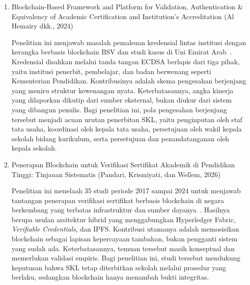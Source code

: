 \begin{enumerate}
    \item {Blockchain-Based Framework and Platform for Validation, Authentication \& Equivalency of Academic Certification and Institution's Accreditation (Al Hemairy dkk., 2024)}\par
    Penelitian ini menjawab masalah pemalsuan kredensial lintas institusi dengan kerangka berbasis blockchain BSV dan studi kasus di Uni Emirat Arab~\cite{AlHemairy2024UAE}. Kredensial disahkan melalui tanda tangan ECDSA berlapis dari tiga pihak, yaitu institusi penerbit, pembelajar, dan badan berwenang seperti Kementerian Pendidikan. Kontribusinya adalah skema pengesahan berjenjang yang meniru struktur kewenangan nyata. Keterbatasannya, angka kinerja yang dilaporkan dikutip dari sumber eksternal, bukan diukur dari sistem yang dibangun penulis. Bagi penelitian ini, pola pengesahan berjenjang tersebut menjadi acuan urutan penerbitan SKL, yaitu penginputan oleh staf tata usaha, koordinasi oleh kepala tata usaha, persetujuan oleh wakil kepala sekolah bidang kurikulum, serta persetujuan dan penandatanganan oleh kepala sekolah.

    \item {Penerapan Blockchain untuk Verifikasi Sertifikat Akademik di Pendidikan Tinggi: Tinjauan Sistematis (Pandari, Krismiyati, dan Wellem, 2026)}\par
    Penelitian ini menelaah 35 studi periode 2017 sampai 2024 untuk menjawab tantangan penerapan verifikasi sertifikat berbasis blockchain di negara berkembang yang terbatas infrastruktur dan sumber dayanya~\cite{Pandari2026Blockchain}. Hasilnya berupa usulan arsitektur hibrid yang menggabungkan Hyperledger Fabric, \textit{Verifiable Credentials}, dan IPFS. Kontribusi utamanya adalah memosisikan blockchain sebagai lapisan kepercayaan tambahan, bukan pengganti sistem yang sudah ada. Keterbatasannya, temuan tersebut masih konseptual dan memerlukan validasi empiris. Bagi penelitian ini, studi tersebut mendukung keputusan bahwa SKL tetap diterbitkan sekolah melalui prosedur yang berlaku, sedangkan blockchain hanya menambah bukti integritas.
\end{enumerate}

